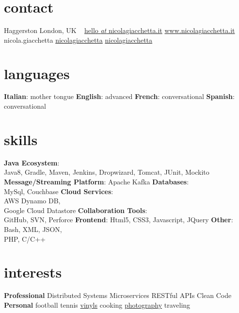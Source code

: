 
\newcommand*{\img}[1]{%
    \raisebox{-.1\baselineskip}{%
        \texttt{[image: \#1]}%
    }%
}



\begin{aside} %
\section{\normalfont contact}
\img{img_tube.png} Haggerston
London, UK
~
\myNumberUK
\href{mailto:\myEmail}{hello {\emph{at}} nicolagiacchetta.it}
\href{http://www.nicolagiacchetta.it/}{www.nicolagiacchetta.it}
\raisebox{-0.4ex}{\skype{}} nicola.giacchetta
 \hspace{0.02cm} \href{https://github.com/nicolagiacchetta}{ nicolagiacchetta}
 \hspace{0.02cm} \href{https://www.linkedin.com/in/nicolagiacchetta}{ nicolagiacchetta}
~
\vspace{-0.1cm}
\section{\normalfont languages}
\textbf{Italian}: mother tongue
\textbf{English}: advanced
\textbf{French}: conversational
\textbf{Spanish}: conversational
~
\vspace{-0.1cm}
\section{\normalfont skills}
\textbf{Java Ecosystem}:\\ Java8, Gradle, Maven, Jenkins, Dropwizard, Tomcat, JUnit, Mockito
\textbf{Message/Streaming Platform}: Apache Kafka
\textbf{Databases}:\\ MySql, Couchbase
\textbf{Cloud Services}:\\ AWS Dynamo DB,\\ Google Cloud Datastore
\textbf{Collaboration Tools}:\\ GitHub, SVN, Perforce 
\textbf{Frontend}: Html5, CSS3, Javascript, JQuery
\textbf{Other}: Bash, XML, JSON,\\ PHP, C/C++ 
~
\vspace{-0.1cm}
\section{\normalfont interests}
\textbf{Professional}
Distributed Systems
Microservices
RESTful APIs
Clean Code
~
\vspace{-0.1cm}
\textbf{Personal}
football
tennis
\href{https://www.discogs.com/user/little_jacket/collection}{vinyls}
cooking
\href{https://www.flickr.com/photos/nicolagiacchetta}{photography}
traveling
~
\end{aside}

